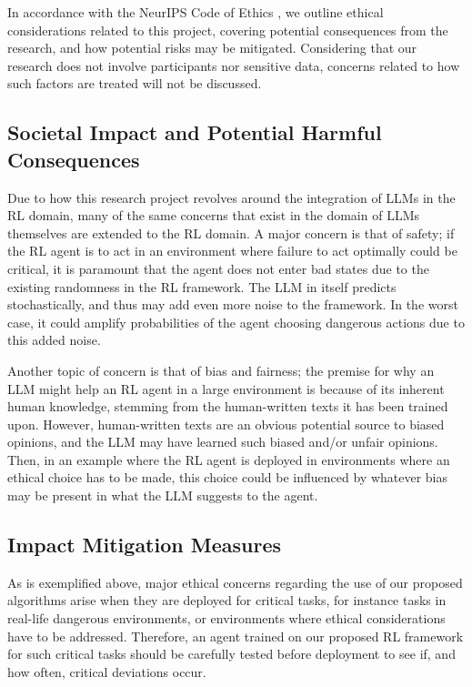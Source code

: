 \documentclass[conference]{IEEEtran}
\begin{document}
In accordance with the NeurIPS Code of Ethics \cite{ethics}, we outline ethical considerations related to this project, covering potential consequences from the research, and how potential risks may be mitigated. Considering that our research does not involve participants nor sensitive data, concerns related to how such factors are treated will not be discussed.

\subsection{Societal Impact and Potential Harmful Consequences}

Due to how this research project revolves around the integration of LLMs in the RL domain, many of the same concerns that exist in the domain of LLMs themselves are extended to the RL domain. A major concern is that of safety; if the RL agent is to act in an environment where failure to act optimally could be critical, it is paramount that the agent does not enter bad states due to the existing randomness in the RL framework. The LLM in itself predicts stochastically, and thus may add even more noise to the framework. In the worst case, it could amplify probabilities of the agent choosing dangerous actions due to this added noise.

Another topic of concern is that of bias and fairness; the premise for why an LLM might help an RL agent in a large environment is because of its inherent human knowledge, stemming from the human-written texts it has been trained upon. However, human-written texts are an obvious potential source to biased opinions, and the LLM may have learned such biased and/or unfair opinions. Then, in an example where the RL agent is deployed in environments where an ethical choice has to be made, this choice could be influenced by whatever bias may be present in what the LLM suggests to the agent.

\subsection{Impact Mitigation Measures}

As is exemplified above, major ethical concerns regarding the use of our proposed algorithms arise when they are deployed for critical tasks, for instance tasks in real-life dangerous environments, or environments where ethical considerations have to be addressed. Therefore, an agent trained on our proposed RL framework for such critical tasks should be carefully tested before deployment to see if, and how often, critical deviations occur.
\end{document}
